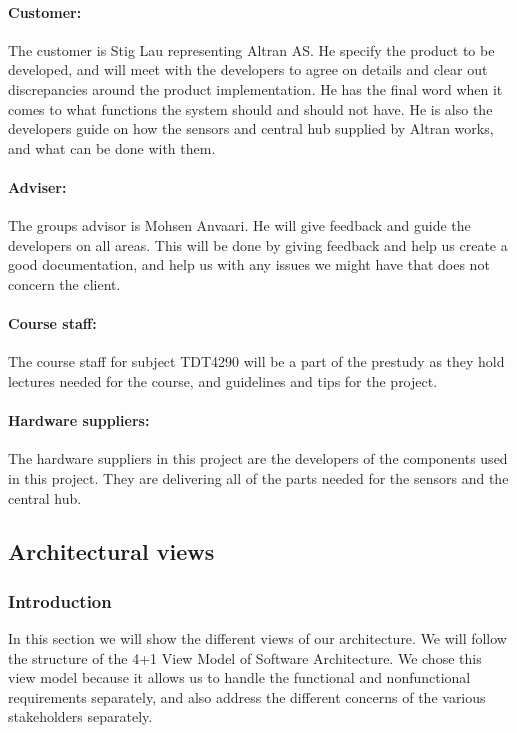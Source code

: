 \documentclass[../document.tex]{subfiles}
\begin{document}
\paragraph{Customer:} The customer is Stig Lau representing Altran AS. He specify the product to be developed, and will meet with the developers to agree on details and clear out discrepancies around the product implementation. He has the final word when it comes to what functions the system should and should not have. He is also the developers guide on how the sensors and central hub supplied by Altran works, and what can be done with them.

\paragraph{Adviser:} The groups advisor is Mohsen Anvaari. He will give feedback and guide the developers on all areas. This will be done by giving feedback and help us create a good documentation, and help us with any issues we might have that does not concern the client.

\paragraph{Course staff:} The course staff for subject TDT4290 will be a part of the prestudy as they hold lectures needed for the course, and guidelines and tips for the project. 

\paragraph{Hardware suppliers:} The hardware suppliers in this project are the developers of the components used in this project. They are delivering all of the parts needed for the sensors and the central hub.

\subsection{Architectural views}
\subsubsection{Introduction}
In this section we will show the different views of our architecture. We will follow the structure of the 4+1 View Model of Software Architecture. We chose this view model because it allows us to handle the functional and nonfunctional requirements separately, and also address the different concerns of the various stakeholders separately. 
\end{document}
